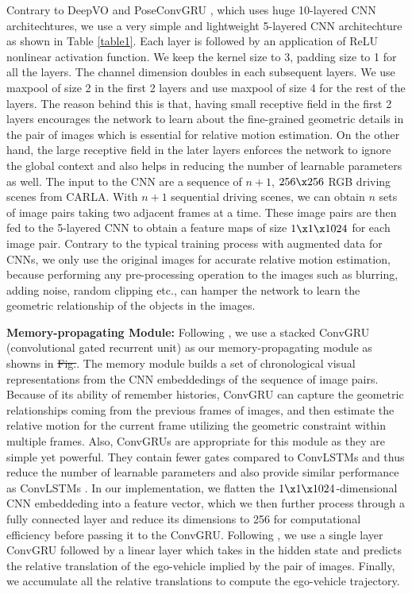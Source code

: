 \documentclass[letterpaper, 12pt]{article}
\theoremstyle{definition}
\theoremstyle{definition}
\theoremstyle{definition}
\theoremstyle{definition}
\theoremstyle{definition}
\begin{document}
Contrary to DeepVO \cite{Wang2017} and PoseConvGRU \cite{Zhai2019}, which uses
huge 10-layered CNN architechtures, we use a very simple and lightweight
5-layered CNN architechture as shown in Table \ref{table1}. Each layer is
followed by an application of ReLU nonlinear activation function. We keep the
kernel size to 3, padding size to 1 for all the layers. The channel dimension
doubles in each subsequent layers. We use maxpool of size 2 in the first 2
layers and use maxpool of size 4 for the rest of the layers. The reason behind
this is that, having small receptive field in the first 2 layers encourages the
network to learn about the fine-grained geometric details in the pair of images
which is essential for relative motion estimation. On the other hand, the large
receptive field in the later layers enforces the network to ignore the global
context and also helps in reducing the number of learnable parameters as
well. The input to the CNN are a sequence of \(n+1\), \(256 \x 256\) RGB driving
scenes from CARLA. With \(n+1\) sequential driving scenes, we can obtain \(n\)
sets of image pairs taking two adjacent frames at a time. These image pairs are
then fed to the 5-layered CNN to obtain a feature maps of size \(1 \x 1 \x
1024\) for each image pair. Contrary to the typical training process with
augmented data for CNNs, we only use the original images for accurate relative
motion estimation, because performing any pre-processing operation to the images
such as blurring, adding noise, random clipping etc., can hamper the network to
learn the geometric relationship of the objects in the images.

\textbf{Memory-propagating Module:} Following \cite{Zhai2019}, we use a stacked ConvGRU
(convolutional gated recurrent unit) \cite{Ballas2015} as our memory-propagating
module as showns in \sout{Fig.}. The memory module builds a set of chronological
visual representations from the CNN embeddedings of the sequence of image
pairs. Because of its ability of remember histories, ConvGRU can capture the
geometric relationships coming from the previous frames of images, and then
estimate the relative motion for the current frame utilizing the geometric
constraint within multiple frames. Also, ConvGRUs are appropriate for this
module as they are simple yet powerful. They contain fewer gates compared to
ConvLSTMs and thus reduce the number of learnable parameters and also provide
similar performance as ConvLSTMs \cite{Chung2014}. In our implementation, we
flatten the \(1 \x 1 \x 1024\)-dimensional CNN embeddeding into a feature
vector, which we then further process through a fully connected layer and reduce
its dimensions to 256 for computational efficiency before passing it to the
ConvGRU. Following \cite{Filos2020}, we use a single layer ConvGRU followed by a
linear layer which takes in the hidden state and predicts the relative
translation of the ego-vehicle implied by the pair of images. Finally, we
accumulate all the relative translations to compute the ego-vehicle trajectory.
\end{document}
